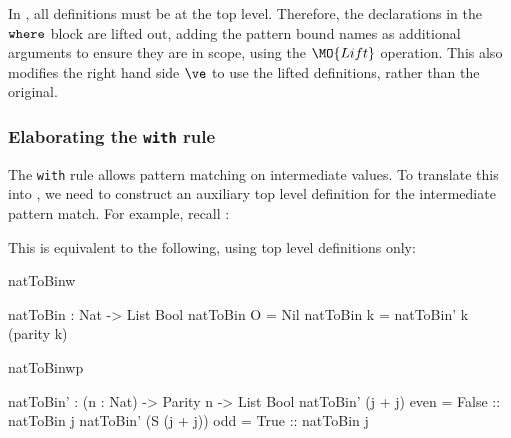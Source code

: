 
In \TT{}, all definitions must be at the top level. Therefore, the declarations 
in the $\mathtt{where}$ block are lifted out, adding the pattern bound names as additional arguments
to ensure they are in scope, using the $\MO{Lift}$ operation. This also modifies
the right hand side $\ve$ to use the lifted definitions, rather than the original.

\subsubsection{Elaborating the \texttt{with} rule}

The \texttt{with} rule allows  pattern matching on intermediate values.
To translate this into \TT{}, we need to construct an auxiliary top level
definition for 
the intermediate pattern match. For example, recall :


\noindent
This is equivalent to the following, using top level definitions only:

\begin{SaveVerbatim}{natToBinw}

natToBin : Nat -> List Bool
natToBin O = Nil
natToBin k = natToBin' k (parity k)

\end{SaveVerbatim}
\begin{SaveVerbatim}{natToBinwp}

natToBin' : (n : Nat) -> Parity n -> List Bool
natToBin' (j + j)     even = False :: natToBin j
natToBin' (S (j + j)) odd  = True  :: natToBin j

\end{SaveVerbatim}


